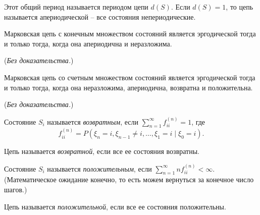 \begin{definition}
  Этот общий период называется периодом цепи $d(S)$.
  Если $d(S) = 1$, то цепь называется апериодической -- все состояния непериодические.
\end{definition}

\begin{theorem}
  Марковская цепь с конечным множеством состояний является эргодической тогда и только тогда,
  когда она апериодична и неразложима.
\end{theorem}
(\emph{Без доказательства.})

\begin{theorem}
  Марковская цепь со счетным множеством состояний является эргодической тогда и только тогда,
  когда она неразложима, апериодична, возвратна и положительна.
\end{theorem}
(\emph{Без доказательства.})

\begin{definition}
  Состояние $S_i$ называется \emph{возвратным}, если $\sum\limits_{n=1}^{\infty} f_{ii}^{(n)} = 1$,
  где 
  \[
    f_{ii}^{(n)} = P(\xi_n = i, \xi_{n-1} \neq i, \dots, \xi_1 = i \mid \xi_0 = i).
  \]
\end{definition}

\begin{definition}
  Цепь называется \emph{возвратной}, если все ее состояния возвратны.
\end{definition}

\begin{definition}
  Состояние $S_i$ называется \emph{положительным}, если
  $\sum\limits_{n=1}^{\infty} n f_{ii}^{(n)} < \infty$.
  (Математическое ожидание конечно, то есть можем вернуться за конечное число шагов.)
\end{definition}

\begin{definition}
  Цепь называется \emph{положительной}, если все ее состояния положительны.
\end{definition}


